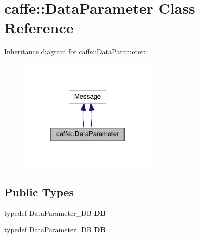 \hypertarget{classcaffe_1_1_data_parameter}{}\section{caffe\+:\+:Data\+Parameter Class Reference}
\label{classcaffe_1_1_data_parameter}


Inheritance diagram for caffe\+:\+:Data\+Parameter\+:
\nopagebreak
\begin{figure}[H]
\begin{center}
\leavevmode
\includegraphics[width=190pt]{classcaffe_1_1_data_parameter__inherit__graph}
\end{center}
\end{figure}
\subsection*{Public Types}
\begin{DoxyCompactItemize}
\item 
\mbox{\label{classcaffe_1_1_data_parameter_a132fbb52c68ef964fd2de6b21f0e5039}} 
typedef Data\+Parameter\+\_\+\+DB {\bfseries DB}
\item 
\mbox{\label{classcaffe_1_1_data_parameter_a132fbb52c68ef964fd2de6b21f0e5039}} 
typedef Data\+Parameter\+\_\+\+DB {\bfseries DB}
\end{DoxyCompactItemize}
